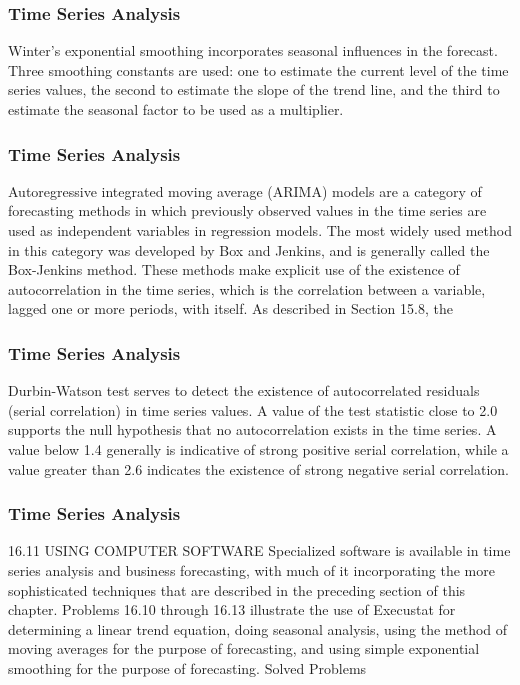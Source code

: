 \begin{frame}
\frametitle{Time Series Analysis}
Winter’s exponential smoothing incorporates seasonal influences in the forecast. Three smoothing
constants are used: one to estimate the current level of the time series values, the second to estimate the slope of
the trend line, and the third to estimate the seasonal factor to be used as a multiplier.
\end{frame}
\begin{frame}
\frametitle{Time Series Analysis}
Autoregressive integrated moving average (ARIMA) models are a category of forecasting methods in which
previously observed values in the time series are used as independent variables in regression models. The most
widely used method in this category was developed by Box and Jenkins, and is generally called the Box-Jenkins
method. These methods make explicit use of the existence of autocorrelation in the time series, which is the
correlation between a variable, lagged one or more periods, with itself. As described in Section 15.8, the
\end{frame}
\begin{frame}
\frametitle{Time Series Analysis}
Durbin-Watson test serves to detect the existence of autocorrelated residuals (serial correlation) in time series
values. A value of the test statistic close to 2.0 supports the null hypothesis that no autocorrelation exists in the
time series. A value below 1.4 generally is indicative of strong positive serial correlation, while a value greater
than 2.6 indicates the existence of strong negative serial correlation.
\end{frame}
\begin{frame}
\frametitle{Time Series Analysis}

16.11 USING COMPUTER SOFTWARE
Specialized software is available in time series analysis and business forecasting, with much of it
incorporating the more sophisticated techniques that are described in the preceding section of this chapter.
Problems 16.10 through 16.13 illustrate the use of Execustat for determining a linear trend equation, doing
seasonal analysis, using the method of moving averages for the purpose of forecasting, and using simple
exponential smoothing for the purpose of forecasting.
Solved Problems
\end{frame}
